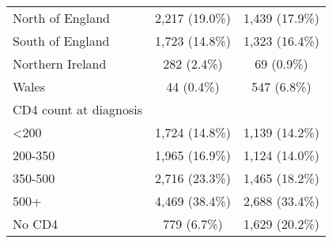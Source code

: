 \begin{table}[!h]
\begin{tabular}[t]{lcc}
\hspace{1em}North of England & 2,217 (19.0\%) & 1,439 (17.9\%)\\
\hspace{1em}South of England & 1,723 (14.8\%) & 1,323 (16.4\%)\\
\hspace{1em}Northern Ireland & 282 (2.4\%) & 69 (0.9\%)\\
\hspace{1em}Wales & 44 (0.4\%) & 547 (6.8\%)\\
CD4 count at diagnosis &  & \\
\hspace{1em}<200 & 1,724 (14.8\%) & 1,139 (14.2\%)\\
\hspace{1em}200-350 & 1,965 (16.9\%) & 1,124 (14.0\%)\\
\hspace{1em}350-500 & 2,716 (23.3\%) & 1,465 (18.2\%)\\
\hspace{1em}500+ & 4,469 (38.4\%) & 2,688 (33.4\%)\\
\hspace{1em}No CD4 & 779 (6.7\%) & 1,629 (20.2\%)\\
\bottomrule
\end{tabular}
\end{table}
